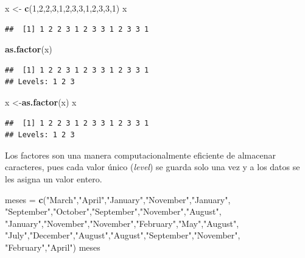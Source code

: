 \documentclass[
]{book}
\newenvironment{Shaded}{\begin{snugshade}}{\end{snugshade}}
\newcommand{\DecValTok}[1]{\textcolor[rgb]{0.00,0.00,0.81}{#1}}
\newcommand{\FunctionTok}[1]{\textcolor[rgb]{0.13,0.29,0.53}{\textbf{#1}}}
\newcommand{\NormalTok}[1]{#1}
\newcommand{\OtherTok}[1]{\textcolor[rgb]{0.56,0.35,0.01}{#1}}
\newcommand{\StringTok}[1]{\textcolor[rgb]{0.31,0.60,0.02}{#1}}
\begin{document}
\begin{Shaded}
\begin{Highlighting}[]
\NormalTok{x }\OtherTok{\textless{}{-}} \FunctionTok{c}\NormalTok{(}\DecValTok{1}\NormalTok{,}\DecValTok{2}\NormalTok{,}\DecValTok{2}\NormalTok{,}\DecValTok{3}\NormalTok{,}\DecValTok{1}\NormalTok{,}\DecValTok{2}\NormalTok{,}\DecValTok{3}\NormalTok{,}\DecValTok{3}\NormalTok{,}\DecValTok{1}\NormalTok{,}\DecValTok{2}\NormalTok{,}\DecValTok{3}\NormalTok{,}\DecValTok{3}\NormalTok{,}\DecValTok{1}\NormalTok{)}
\NormalTok{x}
\end{Highlighting}
\end{Shaded}

\begin{verbatim}
##  [1] 1 2 2 3 1 2 3 3 1 2 3 3 1
\end{verbatim}

\begin{Shaded}
\begin{Highlighting}[]
\FunctionTok{as.factor}\NormalTok{(x)}
\end{Highlighting}
\end{Shaded}

\begin{verbatim}
##  [1] 1 2 2 3 1 2 3 3 1 2 3 3 1
## Levels: 1 2 3
\end{verbatim}

\begin{Shaded}
\begin{Highlighting}[]
\NormalTok{x }\OtherTok{\textless{}{-}}\FunctionTok{as.factor}\NormalTok{(x)}
\NormalTok{x}
\end{Highlighting}
\end{Shaded}

\begin{verbatim}
##  [1] 1 2 2 3 1 2 3 3 1 2 3 3 1
## Levels: 1 2 3
\end{verbatim}

Los factores son una manera computacionalmente eficiente de almacenar caracteres, pues cada valor único (\emph{level}) se guarda solo una vez y a los datos se les asigna un valor entero.

\begin{Shaded}
\begin{Highlighting}[]
\NormalTok{meses }\OtherTok{=} \FunctionTok{c}\NormalTok{(}\StringTok{"March"}\NormalTok{,}\StringTok{"April"}\NormalTok{,}\StringTok{"January"}\NormalTok{,}\StringTok{"November"}\NormalTok{,}\StringTok{"January"}\NormalTok{,}
       \StringTok{"September"}\NormalTok{,}\StringTok{"October"}\NormalTok{,}\StringTok{"September"}\NormalTok{,}\StringTok{"November"}\NormalTok{,}\StringTok{"August"}\NormalTok{,}
        \StringTok{"January"}\NormalTok{,}\StringTok{"November"}\NormalTok{,}\StringTok{"November"}\NormalTok{,}\StringTok{"February"}\NormalTok{,}\StringTok{"May"}\NormalTok{,}\StringTok{"August"}\NormalTok{,}
        \StringTok{"July"}\NormalTok{,}\StringTok{"December"}\NormalTok{,}\StringTok{"August"}\NormalTok{,}\StringTok{"August"}\NormalTok{,}\StringTok{"September"}\NormalTok{,}\StringTok{"November"}\NormalTok{,}
         \StringTok{"February"}\NormalTok{,}\StringTok{"April"}\NormalTok{)}
\NormalTok{meses}
\end{Highlighting}
\end{Shaded}
\end{document}
